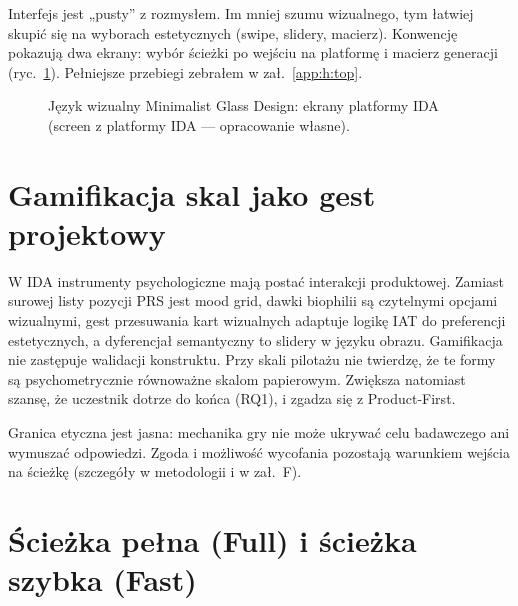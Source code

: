 Interfejs jest „pusty” z rozmysłem. Im mniej szumu wizualnego, tym łatwiej skupić się na wyborach estetycznych (swipe, slidery, macierz). Konwencję pokazują dwa ekrany: wybór ścieżki po wejściu na platformę i macierz generacji (ryc.~\ref{fig:ch07:ui-screens}). Pełniejsze przebiegi zebrałem w zał.~\ref{app:h:top}.

\begin{figure}[htbp]
  \centering
  \caption{Język wizualny Minimalist Glass Design: ekrany platformy IDA (screen z platformy IDA --- opracowanie własne).}
  \label{fig:ch07:ui-screens}
\end{figure}

\section{Gamifikacja skal jako gest projektowy}
\label{ch07:sec:gamifikacja}

W IDA instrumenty psychologiczne mają postać interakcji produktowej. Zamiast surowej listy pozycji PRS jest mood grid, dawki biophilii są czytelnymi opcjami wizualnymi, gest przesuwania kart wizualnych adaptuje logikę IAT do preferencji estetycznych, a dyferencjał semantyczny to slidery w języku obrazu.
Gamifikacja nie zastępuje walidacji konstruktu. Przy skali pilotażu nie twierdzę, że te formy są psychometrycznie równoważne skalom papierowym. Zwiększa natomiast szansę, że uczestnik dotrze do końca (RQ1), i zgadza się z Product-First.

Granica etyczna jest jasna: mechanika gry nie może ukrywać celu badawczego ani wymuszać odpowiedzi. Zgoda i możliwość wycofania pozostają warunkiem wejścia na ścieżkę (szczegóły w metodologii i w zał.~F).

\section{Ścieżka pełna (Full) i ścieżka szybka (Fast)}
\label{ch07:sec:sciezki}

